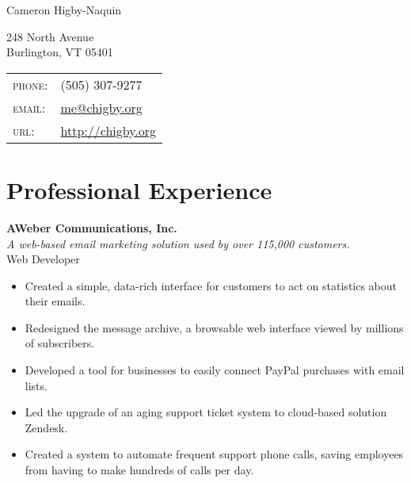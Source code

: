 \documentclass[10pt, a4paper]{article}
\newcommand{\years}[1]{\marginnote{\scriptsize #1}}
\begin{document}
{\LARGE Cameron Higby-Naquin}\\
\begin{multicols}{2}
248 North Avenue\\
Burlington, VT 05401
\vfill
\columnbreak
\begin{tabular}{ll}
\textsc{phone}:&(505) 307-9277\\ %
\textsc{email}:&\href{mailto:me@chigby.org}{me@chigby.org}\\
\textsc{url}:&\href{http://chigby.org/}{http://chigby.org}\\
\end{tabular}
\end{multicols}

\section*{Professional Experience}
\noindent
\years{2009-2012}\textbf{AWeber Communications, Inc.}\\
\textit{A web-based email marketing solution used by over 115,000 customers.}\\
Web Developer
\begin{itemize}
\item Created a simple, data-rich interface for customers to act on statistics about their emails.
\item Redesigned the message archive, a browsable web interface viewed by millions of subscribers.
\item Developed a tool for businesses to easily connect PayPal purchases with email lists. %
\item Led the upgrade of an aging support ticket system to cloud-based solution Zendesk.
\item Created a system to automate frequent support phone calls, saving employees from having to make hundreds of calls per day.
\end{itemize}
\end{document}
